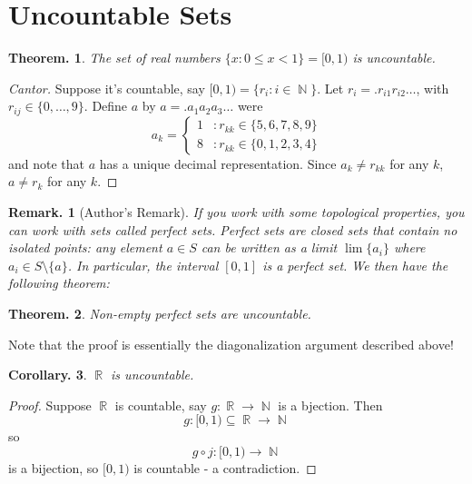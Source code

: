 \documentclass[11pt, a4paper]{memoir}
\DeclareMathOperator{\N}{{\mathbb{N}}}
\DeclareMathOperator{\R}{{\mathbb{R}}}
\theoremstyle{change}
\newtheorem{theorem}{Theorem.}[section]
\newtheorem{corollary}[theorem]{Corollary.}
\theoremstyle{plain}
\theoremstyle{nonumberplain}
\newtheorem{remark}{Remark.}
\newtheorem{proof}{Proof}
\numberwithin{equation}{section}
\begin{document}
\section{Uncountable Sets}
\begin{theorem}
    The set of real numbers $\{x:0\leq x<1\}=[0,1)$ is uncountable.
\end{theorem}
\begin{proof}[Cantor]
    Suppose it's countable, say $[0,1)=\{r_i:i\in\N\}$. Let $r_i=.r_{i1}r_{i2}\ldots$, with $r_{ij}\in\{0,\ldots,9\}$.
    Define $a$ by $a=.a_1a_2a_3\ldots$ were
    \[a_k=
    \begin{cases}
        1 &: r_{kk}\in\{5,6,7,8,9\}\\
        8 &: r_{kk}\in\{0,1,2,3,4\}
    \end{cases}
    \]
    and note that $a$ has a unique decimal representation. Since $a_k\neq r_{kk}$ for any $k$, $a\neq r_k$ for any $k$.
\end{proof}
\begin{remark}[Author's Remark]
    If you work with some topological properties, you can work with sets called \textit{perfect sets}. Perfect sets
    are closed sets that contain no isolated points: any element $a\in S$ can be written as a limit $\lim\{a_i\}$
    where $a_i\in S\setminus\{a\}$. In particular, the interval $[0,1]$ is a perfect set. We then have the following
    theorem:
\end{remark}
\begin{theorem}
    Non-empty perfect sets are uncountable.
\end{theorem}
Note that the proof is essentially the diagonalization argument described above!
\begin{corollary}
    $\R$ is uncountable.
\end{corollary}
\begin{proof}
    Suppose $\R$ is countable, say $g:\R\to\N$ is a bjection. Then
    \[ g:[0,1)\subseteq\R\to\N\]
    so
    \[g\circ j:[0,1)\to\N\]
    is a bijection, so $[0,1)$ is countable - a contradiction.
\end{proof}
\end{document}
